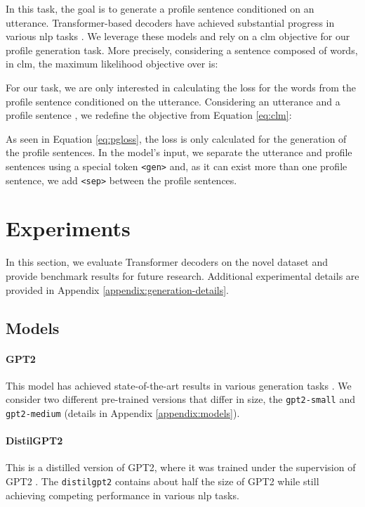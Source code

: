 \documentclass[11pt]{article}
\begin{document}
In this task, the goal is to generate a profile sentence conditioned on an utterance.
Transformer-based decoders have achieved substantial progress in various \gls*{nlp} tasks \cite{GPT2}.
We leverage these models and rely on a \gls*{clm} objective for our profile generation task.
More precisely, considering a sentence  composed of  words, in \gls*{clm}, the maximum likelihood objective over  is:



For our task, we are only interested in calculating the loss for the words from the profile sentence conditioned on the utterance.
Considering an utterance  and a profile sentence , we redefine the objective from Equation \ref{eq:clm}:



As seen in Equation \ref{eq:pgloss}, the loss is only calculated for the generation of the profile sentences.
In the model's input, we separate the utterance and profile sentences using a special token \texttt{<gen>} and, as it can exist more than one profile sentence, we add \texttt{<sep>} between the profile sentences.


\section{Experiments}

In this section, we evaluate Transformer decoders on the novel dataset and provide benchmark results for future research.
Additional experimental details are provided in Appendix \ref{appendix:generation-details}.

\subsection{Models}

\paragraph{GPT2} This model has achieved state-of-the-art results in various generation tasks \cite{GPT2}. We consider two different pre-trained versions that differ in size, the \texttt{gpt2-small} and \texttt{gpt2-medium} (details in Appendix \ref{appendix:models}).
\paragraph{DistilGPT2} This is a distilled version of GPT2, where it was trained under the supervision of GPT2 \cite{DISTIL}. The \texttt{distilgpt2} contains about half the size of GPT2 while still achieving competing performance in various \gls*{nlp} tasks.
\end{document}
